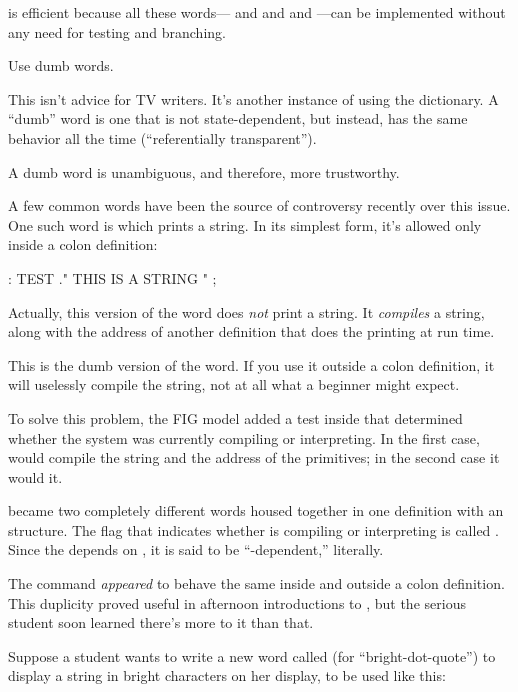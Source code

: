 \Forth{} is efficient because all these words--- and
 and \forth{+} and ---can be implemented without any
need for testing and branching.

\begin{tip}
Use dumb words.
\end{tip}
This isn't advice for TV writers. It's another instance of using the
dictionary. A ``dumb'' word is one that is not state-dependent, but
instead, has the same behavior all the time (``referentially
transparent'').

A dumb word is unambiguous, and therefore, more trustworthy.

A few common \Forth{} words have been the source of controversy recently
over this issue. One such word is  which prints a string.  In
its simplest form, it's allowed only inside a colon definition:

\begin{Code}
: TEST   ." THIS IS A STRING " ;
\end{Code}
Actually, this version of the word does \emph{not} print a string. It
\emph{compiles} a string, along with the address of another definition
that does the printing at run time.

This is the dumb version of the word. If you use it outside a colon
definition, it will uselessly compile the string, not at all what a
beginner might expect.

To solve this problem, the FIG model added a test inside  that
determined whether the system was currently compiling or interpreting.  In
the first case,  would compile the string and the address of the
primitives; in the second case it would  it.

 became two completely different words housed together in one
definition with an  structure. The flag that indicates
whether \Forth{} is compiling or interpreting is called .
Since the  depends on , it is said to be
``-dependent,'' literally.

The command \emph{appeared} to behave the same inside and outside a colon
definition. This duplicity proved useful in afternoon introductions to
\Forth{}, but the serious student soon learned there's more to it than
that.

Suppose a student wants to write a new word called  (for
``bright-dot-quote'') to display a string in bright characters on her
display, to be used like this:


